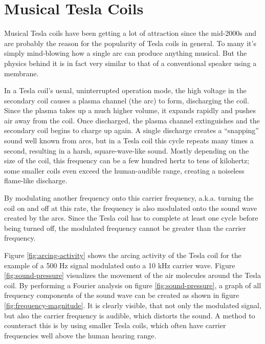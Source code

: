 
\section{Musical Tesla Coils}
\label{sec:musical-tesla-coils}

Musical Tesla coils have been getting a lot of attraction since the mid-2000s and are probably the reason for the popularity of Tesla coils in general. To many it's simply mind-blowing how a single arc can produce anything musical. But the physics behind it is in fact very similar to that of a conventional speaker using a membrane.

In a Tesla coil's usual, uninterrupted operation mode, the high voltage in the secondary coil causes a plasma channel (the arc) to form, discharging the coil. Since the plasma takes up a much higher volume, it expands rapidly and pushes air away from the coil. Once discharged, the plasma channel extinguishes and the secondary coil begins to charge up again. A single discharge creates a \enquote{snapping} sound well known from arcs, but in a Tesla coil this cycle repeats many times a second, resulting in a harsh, square-wave-like sound. Mostly depending on the size of the coil, this frequency can be a few hundred hertz to tens of kilohertz; some smaller coils even exceed the human-audible range, creating a noiseless flame-like discharge.

By modulating another frequency onto this carrier frequency, a.k.a. turning the coil on and off at this rate, the frequency is also modulated onto the sound wave created by the arcs. Since the Tesla coil has to complete at least one cycle before being turned off, the modulated frequency cannot be greater than the carrier frequency. 

Figure \ref{fig:arcing-activity} shows the arcing activity of the Tesla coil for the example of a 500 Hz signal modulated onto a 10 kHz carrier wave. Figure \ref{fig:sound-pressure} visualizes the movement of the air molecules around the Tesla coil. By performing a Fourier analysis on figure \ref{fig:sound-pressure}, a graph of all frequency components of the sound wave can be created as shown in figure \ref{fig:frequency-magnitude}. It is clearly visible, that not only the modulated signal, but also the carrier frequency is audible, which distorts the sound. A method to counteract this is by using smaller Tesla coils, which often have carrier frequencies well above the human hearing range.

